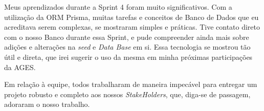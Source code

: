 \begin{reflection}
\indent \originaltab{}Meus aprendizados durante a Sprint 4 foram muito significativos. Com a utilização da ORM Prisma, muitas tarefas e conceitos de Banco de Dados que eu acreditava serem complexas, se mostraram simples e práticas. Tive contato direto com o nosso Banco durante essa Sprint, e pude compreender ainda mais sobre adições e alterações na \textit{seed} e \textit{Data Base} em si. Essa tecnologia se mostrou tão útil e direta, que irei sugerir o uso da mesma em minha próximas participações da AGES.\originalspace{}

\indent \originaltab{}Em relação à equipe, todos trabalharam de maneira impecável para entregar um projeto robusto e completo aos nossos \textit{StakeHolders}, que, diga-se de passagem, adoraram o nosso trabalho.

\end{reflection}
